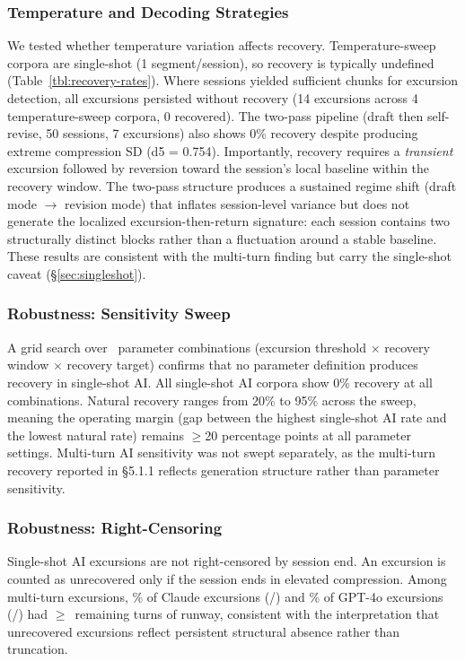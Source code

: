 \documentclass[final]{clv2025}
\begin{document}
\subsubsection{Temperature and Decoding Strategies}

We tested whether temperature variation affects recovery. Temperature-sweep corpora are single-shot (1 segment/session), so recovery is typically undefined (Table~\ref{tbl:recovery-rates}). Where sessions yielded sufficient chunks for excursion detection, all excursions persisted without recovery (14 excursions across 4 temperature-sweep corpora, 0 recovered). The two-pass pipeline (draft then self-revise, 50 sessions, 7 excursions) also shows 0\% recovery despite producing extreme compression SD (d5 = 0.754). Importantly, recovery requires a \textit{transient} excursion followed by reversion toward the session's local baseline within the recovery window. The two-pass structure produces a sustained regime shift (draft mode $\to$ revision mode) that inflates session-level variance but does not generate the localized excursion-then-return signature: each session contains two structurally distinct blocks rather than a fluctuation around a stable baseline. These results are consistent with the multi-turn finding but carry the single-shot caveat (\S\ref{sec:singleshot}).

\subsubsection{Robustness: Sensitivity Sweep}

A grid search over \nSensitivityCombos\ parameter combinations (excursion threshold $\times$ recovery window $\times$ recovery target) confirms that no parameter definition produces recovery in single-shot AI. All single-shot AI corpora show 0\% recovery at all \nSensitivityCombos{} combinations. Natural recovery ranges from 20\% to 95\% across the sweep, meaning the operating margin (gap between the highest single-shot AI rate and the lowest natural rate) remains $\geq$20 percentage points at all parameter settings. Multi-turn AI sensitivity was not swept separately, as the multi-turn recovery reported in \S5.1.1 reflects generation structure rather than parameter sensitivity.

\subsubsection{Robustness: Right-Censoring}

Single-shot AI excursions are not right-censored by session end. An excursion is counted as unrecovered only if the session ends in elevated compression. Among multi-turn excursions, \censorClaudePct\% of Claude excursions (\censorClaudeN/\censorClaudeOf) and \censorGPTPct\% of GPT-4o excursions (\censorGPTN/\censorGPTOf) had $\geq$\censorMinTurns\ remaining turns of runway, consistent with the interpretation that unrecovered excursions reflect persistent structural absence rather than truncation.
\end{document}
